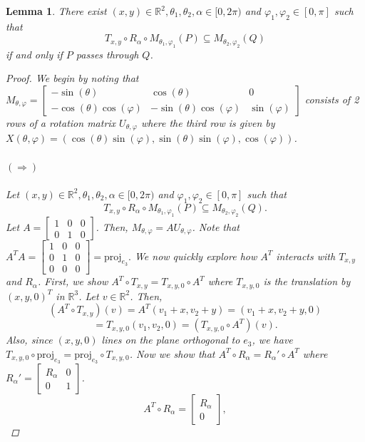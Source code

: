 \documentclass[a4paper]{amsart}
\newtheorem{lem}[thm]{Lemma}
\renewcommand{\phi}{\varphi}
\theoremstyle{remark}
\begin{document}
\begin{lem} \label{lem:pass_through_equiv}
    There exist $(x,y)\in\mathbb{R}^2,\theta_1,\theta_2,\alpha\in[0,2\pi)$ and $\varphi_1,\varphi_2\in[0,\pi]$ such that $$T_{x,y}\circ R_\alpha\circ M_{\theta_1,\phi_1}(P)\subseteq M_{\theta_2,\phi_2}(Q)$$ if and only if $P$ passes through $Q$.
\begin{proof}
    We begin by noting that $M_{\theta,\phi}=\begin{bmatrix}
		-\sin(\theta) & \cos(\theta) & 0\\
		-\cos(\theta)\cos(\phi) & -\sin(\theta)\cos(\phi) & \sin(\phi)
		\end{bmatrix}$ consists of 2 rows of a rotation matrix $U_{\theta,\phi}$ where the third row is given by $X(\theta,\phi)=(\cos(\theta)\sin(\phi),\sin(\theta)\sin(\phi),\cos(\phi))$.
\\\\
$(\Longrightarrow)$
\\\\
Let $(x,y)\in\mathbb{R}^2,\theta_1,\theta_2,\alpha\in[0,2\pi)$ and $\varphi_1,\varphi_2\in[0,\pi]$ such that $$T_{x,y}\circ R_\alpha\circ M_{\theta_1,\phi_1}(P)\subseteq M_{\theta_2,\phi_2}(Q).$$ Let 
$A=\begin{bmatrix} 1 & 0 & 0 \\ 0 & 1 & 0 \end{bmatrix}$. Then, $M_{\theta,\phi}=AU_{\theta,\phi}$. Note that $A^TA=\begin{bmatrix} 1 & 0 & 0\\ 0 & 1 & 0 \\ 0& 0 & 0 \end{bmatrix}=\textrm{proj}_{e_3}.$ We now quickly explore how $A^T$ interacts with $T_{x,y}$ and $R_\alpha$. First, we show $A^T\circ T_{x,y}=T_{x,y,0}\circ A^T$ where $T_{x,y,0}$ is the translation by $(x,y,0)^T$ in $\mathbb{R}^3$. Let $v\in\mathbb{R}^2$. Then,
$$(A^T\circ T_{x,y})(v)=A^T(v_1+x,v_2+y)=(v_1+x,v_2+y,0)$$
$$=T_{x,y,0}(v_1,v_2,0)=(T_{x,y,0}\circ A^T)(v).$$
Also, since $(x,y,0)$ lines on the plane orthogonal to $e_3$, we have $T_{x,y,0}\circ \textrm{proj}_{e_3}=\textrm{proj}_{e_3}\circ T_{x,y,0}$.
Now we show that $A^T\circ R_\alpha=R_\alpha'\circ A^T$ where $R_\alpha'=\begin{bmatrix} R_\alpha & 0 \\ 0 & 1 \end{bmatrix}$.
$$A^T\circ R_\alpha=\begin{bmatrix} R_\alpha \\ 0\end{bmatrix},$$

\end{proof}
\end{lem}
\end{document}
